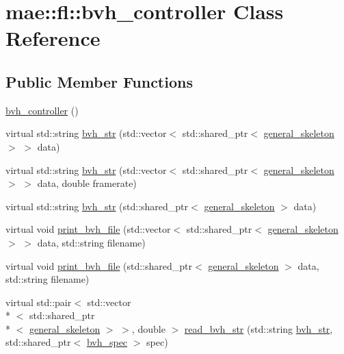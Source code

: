\hypertarget{classmae_1_1fl_1_1bvh__controller}{\section{mae\-:\-:fl\-:\-:bvh\-\_\-controller Class Reference}
\label{classmae_1_1fl_1_1bvh__controller}
}
\subsection*{Public Member Functions}
\begin{DoxyCompactItemize}
\item 
\hyperlink{classmae_1_1fl_1_1bvh__controller_a38904c7bed56dfef82deae0169b5f5de}{bvh\-\_\-controller} ()
\item 
virtual std\-::string \hyperlink{classmae_1_1fl_1_1bvh__controller_ae7fff0274ebbd9456df0055948710711}{bvh\-\_\-str} (std\-::vector$<$ std\-::shared\-\_\-ptr$<$ \hyperlink{classmae_1_1general__skeleton}{general\-\_\-skeleton} $>$ $>$ data)
\item 
virtual std\-::string \hyperlink{classmae_1_1fl_1_1bvh__controller_a7dc209cbe8853f013b7f797c6a079d35}{bvh\-\_\-str} (std\-::vector$<$ std\-::shared\-\_\-ptr$<$ \hyperlink{classmae_1_1general__skeleton}{general\-\_\-skeleton} $>$ $>$ data, double framerate)
\item 
virtual std\-::string \hyperlink{classmae_1_1fl_1_1bvh__controller_adcab54c1d405b841331d0a84680263a7}{bvh\-\_\-str} (std\-::shared\-\_\-ptr$<$ \hyperlink{classmae_1_1general__skeleton}{general\-\_\-skeleton} $>$ data)
\item 
virtual void \hyperlink{classmae_1_1fl_1_1bvh__controller_a0762584eb4f74834d1bde00d3c131100}{print\-\_\-bvh\-\_\-file} (std\-::vector$<$ std\-::shared\-\_\-ptr$<$ \hyperlink{classmae_1_1general__skeleton}{general\-\_\-skeleton} $>$ $>$ data, std\-::string filename)
\item 
virtual void \hyperlink{classmae_1_1fl_1_1bvh__controller_a633e933c666d3dbe85a596e8c9ad122e}{print\-\_\-bvh\-\_\-file} (std\-::shared\-\_\-ptr$<$ \hyperlink{classmae_1_1general__skeleton}{general\-\_\-skeleton} $>$ data, std\-::string filename)
\item 
virtual std\-::pair$<$ std\-::vector\\*
$<$ std\-::shared\-\_\-ptr\\*
$<$ \hyperlink{classmae_1_1general__skeleton}{general\-\_\-skeleton} $>$ $>$, double $>$ \hyperlink{classmae_1_1fl_1_1bvh__controller_aba192edbbf023aa45a88c5bcf3f398a1}{read\-\_\-bvh\-\_\-str} (std\-::string \hyperlink{classmae_1_1fl_1_1bvh__controller_ae7fff0274ebbd9456df0055948710711}{bvh\-\_\-str}, std\-::shared\-\_\-ptr$<$ \hyperlink{classmae_1_1fl_1_1bvh__spec}{bvh\-\_\-spec} $>$ spec)

\end{DoxyCompactItemize}
